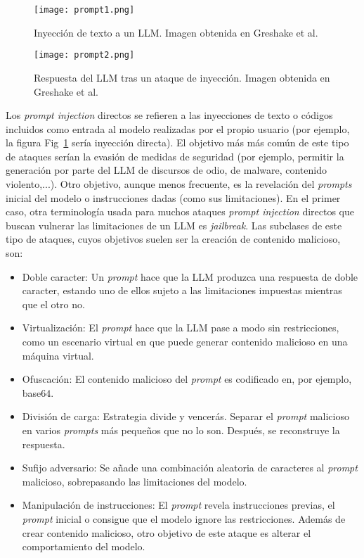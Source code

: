 \begin{figure}[h]
    \centering
    \texttt{[image: prompt1.png]}
    \caption{Inyección de texto a un LLM. Imagen obtenida en Greshake et al.~\cite{PromptEjemplo} }
    \label{fig:prompt1}
\end{figure}

\begin{figure}[h]
    \centering
    \texttt{[image: prompt2.png]}
    \caption{Respuesta del LLM tras un ataque de inyección. Imagen obtenida en Greshake et al.~\cite{PromptEjemplo}}
    \label{fig:prompt2}
\end{figure}


Los \textit{prompt injection} directos se refieren a las inyecciones de texto o códigos incluidos como entrada al modelo realizadas por el propio usuario (por ejemplo, la figura Fig~\ref{fig:prompt1} sería inyección directa). El objetivo más más común de este tipo de ataques serían la evasión de medidas de seguridad (por ejemplo, permitir la generación por parte del LLM de discursos de odio, de malware, contenido violento,...). Otro objetivo, aunque menos frecuente, es la revelación del \textit{prompts} inicial del modelo o instrucciones dadas (como sus limitaciones). En el primer caso, otra terminología usada para muchos ataques \textit{prompt injection} directos que buscan vulnerar las limitaciones de un LLM es \textit{jailbreak}. Las subclases de este tipo de ataques, cuyos objetivos suelen ser la creación de contenido malicioso, son:

\begin{itemize}
	\item Doble caracter: Un \textit{prompt} hace que la LLM produzca una respuesta de doble caracter, estando uno de ellos sujeto a las limitaciones impuestas mientras que el otro no.
	
	\item Virtualización: El \textit{prompt} hace que la LLM pase a modo sin restricciones, como un escenario virtual en que puede generar contenido malicioso en una máquina virtual.
	
	\item Ofuscación: El contenido malicioso del \textit{prompt} es codificado en, por ejemplo, base$64$.
	
	\item División de carga: Estrategia divide y vencerás. Separar el \textit{prompt} malicioso en varios \textit{prompts} más pequeños que no lo son. Después, se reconstruye la respuesta.
	
	\item Sufijo adversario: Se añade una combinación aleatoria de caracteres al \textit{prompt} malicioso, sobrepasando las limitaciones del modelo.
	
	\item Manipulación de instrucciones: El \textit{prompt} revela instrucciones previas, el \textit{prompt} inicial o consigue que el modelo ignore las restricciones. Además de crear contenido malicioso, otro objetivo de este ataque es alterar el comportamiento del modelo.
	
\end{itemize}


